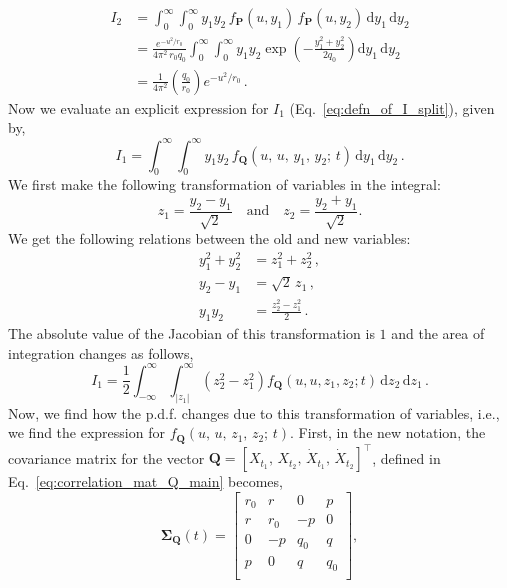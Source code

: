 \documentclass[journal]{IEEEtran}
\theoremstyle{plain}
\theoremstyle{definition}
\theoremstyle{remark}
\newcommand{\dd}{\mathrm{d}}
\begin{document}
\begin{equation}
\begin{split}
    I_2 &= \int_{0}^\infty \int_{0}^\infty y_1 y_2 \, f_{\mathbf{P}}(u,y_1) \, f_{\mathbf{P}}(u,y_2) \, \dd y_1 \, \dd y_2 \\
    &= \frac{e^{-u^2/r_0}}{4\pi^2 \, r_0 q_0}\int_{0}^\infty \int_{0}^\infty y_1 y_2  \exp\left(-\frac{y_1^2 + y_2^2}{2q_0}\right)  \dd y_1 \, \dd y_2 \\
    &= \frac{1}{4\pi^2 }\left(\frac{q_0}{r_0}\right)e^{-u^2/r_0} \,.
\end{split} \label{eq:final_expr_for_I2}
\end{equation}
Now we evaluate an explicit expression for $I_1$ (Eq.~\eqref{eq:defn_of_I_split}), given by,
\begin{equation}
    I_1 = \int_{0}^\infty \int_{0}^\infty y_1 y_2 \,f_{\mathbf{Q}}(u, \,u, \,y_1, \,y_2; \, t) \, \dd y_1 \, \dd y_2 \,.
\end{equation}
We first make the following transformation of variables in the integral:
\begin{equation}
    z_1 = \frac{y_2 - y_1}{\sqrt{2}} \quad \text{and} \quad z_2 = \frac{y_2 + y_1}{\sqrt{2}}. \label{eq:transformation_defined}
\end{equation}
We get the following relations between the old and new variables:
\begin{equation}
\begin{split}
    y_1^2 + y_2^2 &= z_1^2 + z_2^2 \,, \\
    y_2 - y_1 &= \sqrt{2} \, z_1 \,, \\
    y_1 y_2 &= \frac{z_2^2 - z_1^2}{2} \,.
\end{split} \label{eq:transformation_relations}
\end{equation}
The absolute value of the Jacobian of this transformation is $1$ and the area of integration changes as follows,
\begin{equation}
    I_1 = \frac{1}{2}\int_{-\infty}^\infty \int_{|z_1|}^\infty \left(z_2^2 - z_1^2\right) f_{\mathbf{Q}}(u, u, z_1, z_2; t) \, \dd z_2 \,\dd z_1 \,. \label{eq:I1_defn_z1_z2}
\end{equation}
Now, we find how the p.d.f. changes due to this transformation of variables, i.e., we find the expression for $f_{\mathbf{Q}}(u, \,u, \,z_1, \,z_2; \, t)$. First, in the new notation, the covariance matrix for the vector $\mathbf{Q} = [X_{t_1}, \, X_{t_2}, \, \dot{X}_{t_1}, \, \dot{X}_{t_2}]^\top$, defined in Eq.~\eqref{eq:correlation_mat_Q_main} becomes,
\begin{equation}
\renewcommand{\arraystretch}{1.2}
    \boldsymbol{\Sigma}_{\mathbf{Q}}(t) = \begin{bmatrix}
                r_0 & r & 0 & p \\
                r & r_0 & -p & 0 \\
                0 & -p & q_0 & q \\
                p & 0 & q & q_0 \\
                \end{bmatrix}, \label{eq:correlation_mat_Q_main_new_notation}
\end{equation}
\end{document}
